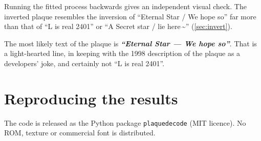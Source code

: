 \documentclass[10pt,a4paper]{article}
\newcommand{\q}[1]{``#1''}
\begin{document}
Running the fitted process backwards gives an independent visual check. The inverted plaque resembles the inversion
of \q{Eternal Star / We hope so} far more than that of \q{L is real 2401} or \q{A Secret star / lie here\,\textasciitilde}
(\cref{sec:invert}).

The most likely text of the plaque is \textbf{\textit{\q{Eternal Star --- We hope so}}}. That is a light-hearted line,
in keeping with the 1998 description of the plaque as a developers' joke, and certainly not \q{L is real 2401}.

\appendix
\section{Reproducing the results}
The code is released as the Python package \texttt{plaquedecode} (MIT licence). No ROM, texture or commercial font is
distributed.
\end{document}
